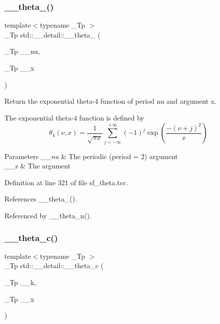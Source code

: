 \mbox{\label{namespacestd_1_1____detail_a274d3801b84bcaad13c274c8bab32bcc}} 
\subsubsection{\texorpdfstring{\+\_\+\+\_\+theta\+\_()}{\_\_theta\_4()}}
{\footnotesize\ttfamily template$<$typename \+\_\+\+Tp $>$ \\
\+\_\+\+Tp std\+::\+\_\+\+\_\+detail\+::\+\_\+\+\_\+theta\+\_ (\begin{DoxyParamCaption}\item[{\+\_\+\+Tp}]{\+\_\+\+\_\+nu,  }\item[{\+\_\+\+Tp}]{\+\_\+\+\_\+x }\end{DoxyParamCaption})}

Return the exponential theta-\/4 function of period {\ttfamily nu} and argument {\ttfamily x}.

The exponential theta-\/4 function is defined by \[ \theta_4(\nu,x) = \frac{1}{\sqrt{\pi x}} \sum_{j=-\infty}^{+\infty} (-1)^j \exp\left( \frac{-(\nu + j)^2}{x} \right) \]


\begin{DoxyParams}{Parameters}
{\em \+\_\+\+\_\+nu} & The periodic (period = 2) argument \\
\hline
{\em \+\_\+\+\_\+x} & The argument \\
\hline
\end{DoxyParams}


Definition at line 321 of file sf\+\_\+theta.\+tcc.



References \+\_\+\+\_\+theta\+\_().



Referenced by \+\_\+\+\_\+theta\+\_\+n().

\mbox{\label{namespacestd_1_1____detail_af95cdf16bfcf6c138d621b0c518a3299}} 
\subsubsection{\texorpdfstring{\+\_\+\+\_\+theta\+\_\+c()}{\_\_theta\_c()}}
{\footnotesize\ttfamily template$<$typename \+\_\+\+Tp $>$ \\
\+\_\+\+Tp std\+::\+\_\+\+\_\+detail\+::\+\_\+\+\_\+theta\+\_\+c (\begin{DoxyParamCaption}\item[{\+\_\+\+Tp}]{\+\_\+\+\_\+k,  }\item[{\+\_\+\+Tp}]{\+\_\+\+\_\+x }\end{DoxyParamCaption})}

